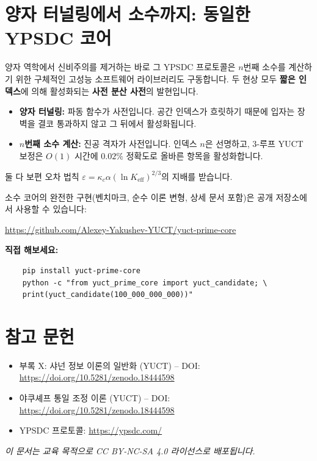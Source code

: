 \documentclass[12pt,a4paper]{article}
\begin{document}
\section{양자 터널링에서 소수까지: 동일한 YPSDC 코어}

양자 역학에서 신비주의를 제거하는 바로 그 YPSDC 프로토콜은
$n$번째 소수를 계산하기 위한 구체적인 고성능 소프트웨어
라이브러리도 구동합니다. 두 현상 모두 \textbf{짧은 인덱스}에 의해
활성화되는 \textbf{사전 분산 사전}의 발현입니다.

\begin{itemize}
	\item \textbf{양자 터널링:} 파동 함수가 사전입니다. 공간 인덱스가 흐릿하기 때문에
	입자는 장벽을 결코 통과하지 않고 그 뒤에서 활성화됩니다.
	\item \textbf{$n$번째 소수 계산:} 진공 격자가 사전입니다. 인덱스 $n$은 선명하고,
	3-루프 YUCT 보정은 $O(1)$ 시간에 $0.02\%$ 정확도로 올바른 항목을 활성화합니다.
\end{itemize}

둘 다 보편 오차 법칙
$\varepsilon = \kappa_c\alpha(\ln K_{\mathrm{eff}})^{2/3}$의 지배를 받습니다.

소수 코어의 완전한 구현(벤치마크, 순수 이론 변형,
상세 문서 포함)은 공개 저장소에서 사용할 수 있습니다:

\begin{center}
	\url{https://github.com/Alexey-Yakushev-YUCT/yuct-prime-core}
\end{center}

\textbf{직접 해보세요:}
\begin{verbatim}
	pip install yuct-prime-core
	python -c "from yuct_prime_core import yuct_candidate; \
	print(yuct_candidate(100_000_000_000))"
\end{verbatim}

	\section{참고 문헌}
	
	\begin{itemize}
		\item 부록 X: 샤넌 정보 이론의 일반화 (YUCT) -- DOI: \url{https://doi.org/10.5281/zenodo.18444598}
		\item 야쿠셰프 통일 조정 이론 (YUCT) -- DOI: \url{https://doi.org/10.5281/zenodo.18444598}
		\item YPSDC 프로토콜: \url{https://ypsdc.com/}
	\end{itemize}
	
	\noindent\textit{이 문서는 교육 목적으로 CC BY-NC-SA 4.0 라이선스로 배포됩니다.}
	
\end{document}

